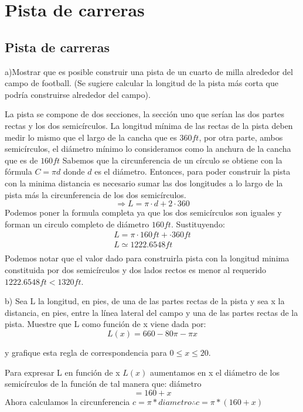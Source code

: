 \chapter*{Pista de carreras}
\section*{Pista de carreras}
a)Mostrar que es posible construir una pista de un cuarto de milla alrededor del
campo de football. (Se sugiere calcular la longitud de la pista más corta que podría
construirse alrededor del campo).

\vspace{0.1cm}

La pista se compone de dos secciones, la sección uno que serían las dos partes rectas y los dos semicírculos. La longitud mínima de las rectas de la pista deben medir lo mismo que el largo de la cancha que es $360ft$, por otra parte, ambos semicírculos, el diámetro mínimo lo consideramos como la anchura de la cancha que es de $160ft$
Sabemos que la circunferencia de un círculo se obtiene con la fórmula $C=\pi d$ donde $d$ es el diámetro.
Entonces, para poder construir la pista con la minima distancia es necesario sumar las dos longitudes a lo largo de la pista más la circunferencia de los dos semicírculos.
$$\Rightarrow L=\pi \cdot d + 2\cdot 360$$
Podemos poner la formula completa ya que los dos semicírculos son iguales y forman un circulo completo de diámetro $160ft$.
Sustituyendo: 
\begin{gather*}
    L=\pi\cdot160ft+\cdot360ft\\
    L\simeq 1222.6548ft\\
\end{gather*}
Podemos notar que el valor dado para construirla pista con la longitud minima constituida por dos semicírculos y dos lados rectos es menor al requerido $1222.6548ft<1320ft$.
\vspace{0.2cm}

b) Sea L la longitud, en pies, de una de las partes rectas de la pista y sea x la distancia, en pies, entre la línea lateral del campo y una de las partes rectas de la pista. Muestre que L como función de x viene dada por:
$$L(x) = 660 - 80 \pi - \pi x$$

y grafique esta regla de correspondencia para $0 \leq x \leq 20$.
\vspace{0.2cm}

Para expresar L en función de x $L(x)$ aumentamos en x el diámetro de los semicírculos de la función de tal manera que: diámetro $$=160 + x$$
Ahora calculamos la circunferencia  $c=\pi*diametro\therefore c=\pi*(160+x)$

